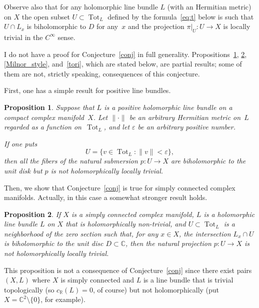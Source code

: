 \documentclass[11pt]{amsart}
\newcommand*{\C}{{\mathbb C}}
\newcommand*{\R}{{\mathbb R}}
\DeclareMathOperator{\Tot}{Tot}
\let\eps\varepsilon
\newtheorem{proposition}{Proposition}[section]
\theoremstyle{remark}
\theoremstyle{definition}
\begin{document}
Observe also that for any holomorphic line bundle $L$ (with an
Hermitian metric) on $X$
the open subset $U\subset\Tot_L$ defined by the
formula~\eqref{eq:t} below is such that $U\cap L_x$ is biholomorphic to
$D$ for any~$x$ and the projection $\pi|_U\colon U\to X$ is locally
trivial in the $C^\infty$ sense.

I do not have a proof for Conjecture~\ref{conj} in full generality.
Propositions~\ref{positive}, \ref{prop:simply-connected},
\ref{Milnor_style}, and~\ref{tori}, which are stated below, are
partial results; some of them are not, strictly speaking, consequences
of this conjecture.

First, one has a simple result for positive line bundles.

\begin{proposition}\label{positive}
Suppose that $L$ is a positive holomorphic line bundle on a compact
complex manifold~$X$.  Let $\|\cdot\|$ be an arbitrary Hermitian
metric on~$L$ regarded as a function on~$\Tot_L$, and let $\eps$ be an
arbitrary positive number.

If one puts
\begin{equation}\label{eq:t}
U=\{v\in\Tot_L\colon \|v\|<\eps\},  
\end{equation}
then all the fibers of the natural submersion $p\colon U\to X$ are
biholomorphic to the unit disk but $p$ is not
holomorphically locally trivial. 
\end{proposition}

Then, we show that Conjecture~\ref{conj} is true for simply connected
complex manifolds. Actually, in this case a somewhat stronger result
holds. 

\begin{proposition}\label{prop:simply-connected}
If $X$ is a simply connected complex manifold, $L$ is a holomorphic
line bundle $L$ on $X$ that is holomorphically non-trivial, and
$U\subset \Tot_L$ is a neighborhood of the zero section
such that, for any $x\in X$, the intersection $L_x\cap U$
is biholomorphic to the unit disc $D\subset\C$, then the natural
projection $p\colon U\to X$ is not holomorphically locally trivial.
\end{proposition}

This proposition is not a consequence of Conjecture~\ref{conj} since
there exist pairs $(X,L)$ where $X$ is simply connected and $L$ is a
line bundle that is trivial topologically (so $c_\R(L)=0$, of course)
but not holomorphically (put $X=\C^2\setminus\{0\}$, for example).
\end{document}
